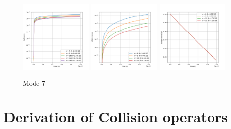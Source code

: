 \documentclass{article}[draft]
\begin{document}
\begin{figure}[!htbp]
	\centering
	\includegraphics[width=0.32\textwidth]{fig/dat_1ev_cs_m7_tail.png}
	\includegraphics[width=0.32\textwidth]{fig/dat_1ev_cs_m7_temp_error.png}
	\includegraphics[width=0.32\textwidth]{fig/dat_1ev_cs_m7_temp.png}
	\caption{Mode 7}
\end{figure}






\newpage
\appendix
\section{Derivation of Collision operators}
\label{sec:coll_op_derivation}
\end{document}
